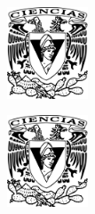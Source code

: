 
  
\begin{titlepage}



\begin{addmargin}[-1cm]{-3cm}

\noindent
\begin{minipage}[c][0.99\textheight][c]{0.2\textwidth}%
	\noindent\begin{minipage}[t][0.15\textheight][c]{\textwidth}
		\begin{center}	
		\includegraphics[height=2.718cm]{gfx/Escudo-FCIENCIAS.pdf}
		\end{center}
	\end{minipage}%
        \vspace{14.4cm}
	\noindent\begin{minipage}[b][0.15\textheight][c]{\textwidth}
		\begin{center}	
		\includegraphics[height=2.718cm]{gfx/Escudo-FCIENCIAS.pdf}
		\end{center}
	\end{minipage}%
\end{minipage}
\hfil%
\begin{minipage}[c][0.99\textheight][t]{0.9\textwidth}
	\begin{center}
        \large


\end{center}
\end{minipage}
\end{addmargin}
\end{titlepage}
